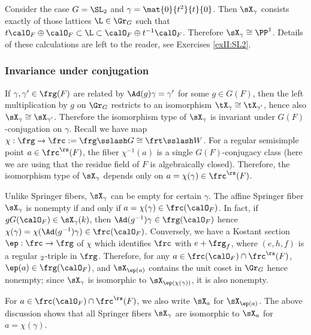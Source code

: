 \subsubsection{}\label{SL2 ram dim 1} Consider the case $G=\SL_{2}$ and $\gamma=\mat{0}{t^{2}}{t}{0}$. Then $\sX_{\gamma}$ consists exactly of those lattices $\L\in\Gr_{G}$ such that $t\calO_{F}\oplus \calO_{F}\subset\L\subset\calO_{F}\oplus t^{-1}\calO_{F}$. Therefore $\sX_{\gamma}\cong\PP^{1}$. Details of these calculations are left to the reader, see Exercises \ref{exII:SL2}.





\subsubsection{Invariance under conjugation} If $\gamma,\gamma'\in\frg(F)$ are related by $\Ad(g)\gamma=\gamma'$ for some $g\in G(F)$, then the left multiplication by $g$ on $\Gr_{G}$ restricts to an isomorphism $\tX_{\gamma}\cong\tX_{\gamma'}$, hence also $\sX_{\gamma}\cong\sX_{\gamma'}$. Therefore the isomorphism type of $\sX_{\gamma}$ is invariant under $G(F)$-conjugation on $\gamma$.  Recall we have map $\chi:\frg\to \frc:=\frg\sslash G\cong\frt\sslash W$. For a regular semisimple point $a\in\frc^{\rs}(F)$, the fiber $\chi^{-1}(a)$ is a single $G(F)$-conjugacy class (here we are using that the residue field of $F$ is algebraically closed). Therefore, the isomorphism type of $\sX_{\gamma}$  depends only on $a=\chi(\gamma)\in\frc^{\rs}(F)$. 

Unlike Springer fibers, $\sX_{\gamma}$ can be empty for certain $\gamma$. The affine Springer fiber $\sX_{\gamma}$ is nonempty if and only if $a=\chi(\gamma)\in\frc(\calO_{F})$. In fact, if $gG(\calO_{F})\in\sX_{\gamma}(k)$, then $\Ad(g^{-1})\gamma\in\frg(\calO_{F})$ hence $\chi(\gamma)=\chi(\Ad(g^{-1})\gamma)\in\frc(\calO_{F})$. Conversely, we have a Kostant section $\ep: \frc\to \frg$ of $\chi$ which identifies $\frc$ with $e+\frg_{f}$, where $(e,h,f)$ is a regular $\sl_{2}$-triple in $\frg$. Therefore, for any $a\in\frc(\calO_{F})\cap\frc^{\rs}(F)$, $\ep(a)\in\frg(\calO_{F})$, and $\sX_{\ep(a)}$ contains the unit coset in $\Gr_{G}$ hence nonempty; since $\sX_{\gamma}$ is isomorphic to $\sX_{\ep(\chi(\gamma))}$, it is also nonempty.

For $a\in\frc(\calO_{F})\cap\frc^{\rs}(F)$, we also write $\sX_{a}$ for $\sX_{\ep(a)}$. The above discussion shows that all Springer fibers $\sX_{\gamma}$ are isomorphic to $\sX_{a}$ for $a=\chi(\gamma)$.



